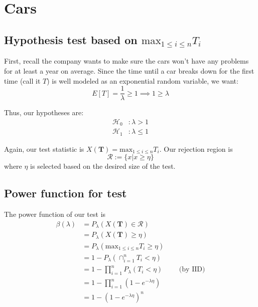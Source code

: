 \documentclass[paper=a4, fontsize=11pt]{scrartcl} %
\numberwithin{equation}{section} %
\numberwithin{figure}{section} %
\numberwithin{table}{section} %
\begin{document}

\section{Cars}
\subsection{Hypothesis test based on $\textrm{max}_{1 \leq i \leq n} T_i$}

First, recall the company wants to make sure the cars won't have any problems for at least a year on average. Since the time until a car breaks down for the first time (call it $T$) is well modeled as an exponential random variable, we want:
\[E[T] = \frac{1}{\lambda} \geq 1 \implies 1 \geq \lambda\]

Thus, our hypotheses are:
\begin{align*}
\mathcal{H}_0&: \lambda > 1 \\
\mathcal{H}_1&: \lambda \leq 1
\end{align*}

Again, our test statistic is $X(\textbf{T}) = \textrm{max}_{1 \leq i \leq n} T_i$. Our rejection region is 
\[ \mathcal{R} := \{x | x \geq \eta\} \]
where $\eta$ is selected based on the desired size of the test.

\subsection{Power function for test}

The power function of our test is
\begin{align*}
\beta(\lambda) &= P_{\lambda}(X(\textbf{T}) \in \mathcal{R}) \\
   &= P_{\lambda}(X(\textbf{T}) \geq \eta) \\
   &= P_{\lambda}( \textrm{max}_{1 \leq i \leq n} T_i \geq \eta) \\
   &= 1 - P_{\lambda}(\cap_{i=1}^{n}T_i < \eta) \\
   &= 1 - \prod_{i=1}^{n} P_{\lambda}(T_i < \eta) \qquad{} \textrm{ (by IID)} \\
   &= 1 - \prod_{i=1}^{n} \left( 1 - e^{- \lambda \eta} \right)\\
   &= 1 - \left( 1 - e^{- \lambda \eta} \right)^n
\end{align*}
\end{document}

